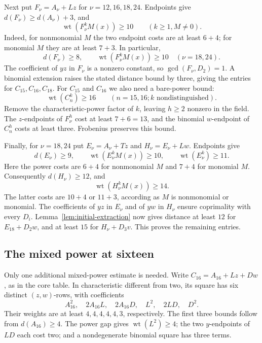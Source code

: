\documentclass[11pt]{article}
\DeclareMathOperator{\wt}{wt}\DeclareMathOperator{\ord}{ord}
\numberwithin{equation}{section}
\theoremstyle{definition}\newtheorem{definition}[theorem]{Definition}
\theoremstyle{remark}\newtheorem{remark}[theorem]{Remark}
\begin{document}
Next put $F_\nu=A_\nu+Lz$ for $\nu=12,16,18,24$.
Endpoints give $d(F_\nu)\ge d(A_\nu)+3$, and
\begin{equation}\label{eq:initial-fifteen-F}
 \wt(F_\nu^kM(x))\ge10\qquad(k\ge1, M\ne0).
\end{equation}
Indeed, for nonmonomial $M$ the two endpoint costs are at least $6+4$;
for monomial $M$ they are at least $7+3$. In particular,
\begin{equation}\label{eq:initial-late-F}
 d(F_\nu)\ge8,\qquad \wt(F_\nu^kM(x))\ge10
 \quad(\nu=18,24).
\end{equation}
The coefficient of $yz$ in $F_\nu$ is a nonzero constant, so
$\gcd(F_\nu,D_2)=1$. A binomial extension raises the stated distance
bound by three, giving the entries for $C_{15},C_{16},C_{18}$.
For $C_{15}$ and $C_{16}$ we also need a bare-power bound:
\[
 \wt(C_n^k)\ge16\qquad(n=15,16; k\text{ nondistinguished}).
\]
Remove the characteristic-power factor of $k$, leaving $h\ge2$
nonzero in the field. The $z$-endpoints of $F_\nu^h$ cost at least
$7+6=13$, and the binomial $w$-endpoint of $C_n^h$ costs at least
three. Frobenius preserves this bound.

Finally, for $\nu=18,24$ put $E_\nu=A_\nu+Tz$ and
$H_\nu=E_\nu+Lw$. Endpoints give
\begin{equation}\label{eq:initial-late-E}
 d(E_\nu)\ge9,\qquad
 \wt(E_\nu^kM(x))\ge10,\qquad \wt(E_\nu^k)\ge11.
\end{equation}
Here the power costs are $6+4$ for nonmonomial $M$ and $7+4$ for
monomial $M$. Consequently $d(H_\nu)\ge12$, and
\begin{equation}\label{eq:initial-twentyone-power}
 \wt(H_\nu^kM(x))\ge14.
\end{equation}
The latter costs are $10+4$ or $11+3$, according as $M$ is
nonmonomial or monomial. The coefficients of $yz$ in $E_\nu$ and
of $yw$ in $H_\nu$ ensure coprimality with every $D_i$.
Lemma~\ref{lem:initial-extraction} now gives distance at least $12$
for $E_{18}+D_2w$, and at least $15$ for $H_\nu+D_3v$.
This proves the remaining entries.

\subsection{The mixed power at sixteen}

Only one additional mixed-power estimate is needed. Write
$C_{16}=A_{16}+Lz+Dw$, as in the core table. In characteristic
different from two, its square has six distinct $(z,w)$-rows,
with coefficients
\[
 A_{16}^2,\quad 2A_{16}L,\quad 2A_{16}D,\quad L^2,\quad 2LD,\quad D^2.
\]
Their weights are at least $4,4,4,4,4,3$, respectively. The first
three bounds follow from $d(A_{16})\ge4$. The power gap gives
$\wt(L^2)\ge4$; the two $y$-endpoints of $LD$ each cost two;
and a nondegenerate binomial square has three terms.
\end{document}
